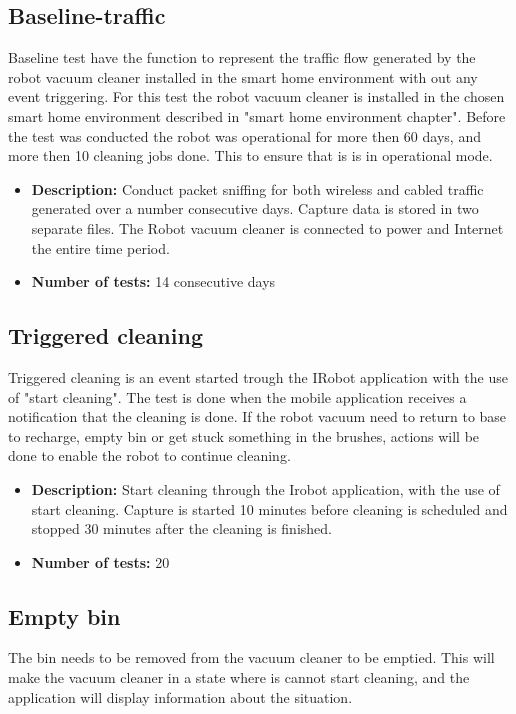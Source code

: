 \subsection{Baseline-traffic}
Baseline test have the function to represent the traffic flow generated by the robot vacuum cleaner installed in the smart home environment with out any event triggering. For this test the robot vacuum cleaner is installed in the chosen smart home environment described in "smart home environment chapter". Before the test was conducted the robot was operational for more then 60 days, and more then 10 cleaning jobs done. This to ensure that is is in operational mode.

\begin{itemize}
    \item \textbf{Description:} Conduct packet sniffing for both wireless and cabled traffic generated over a number consecutive days. Capture data is stored in two separate files. The Robot vacuum cleaner is connected to power and Internet the entire time period.
    \item \textbf{Number of tests:} 14 consecutive days
\end{itemize}

\subsection{Triggered cleaning}
Triggered cleaning is an event started trough the IRobot application with the use of "start cleaning". The test is done when the mobile application receives a notification that the cleaning is done. If the robot vacuum need to return to base to recharge, empty bin or get stuck something in the brushes, actions will be done to enable the robot to continue cleaning. 
\begin{itemize}
    \item \textbf{Description:} Start cleaning through the Irobot application, with the use of start cleaning. Capture is started 10 minutes before cleaning is scheduled and stopped 30 minutes after the cleaning is finished. 
    \item \textbf{Number of tests:} 20
\end{itemize}

\subsection{Empty bin} The bin needs to be removed from the vacuum cleaner to be emptied. This will make the vacuum cleaner in a state where is cannot start cleaning, and the application will display information about the situation. 

